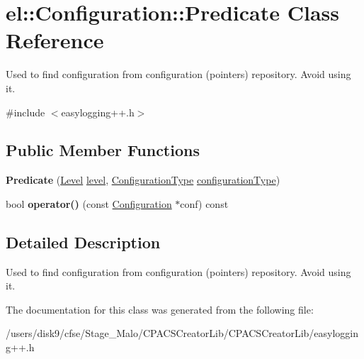 \hypertarget{classel_1_1Configuration_1_1Predicate}{\section{el\-:\-:Configuration\-:\-:Predicate Class Reference}
\label{classel_1_1Configuration_1_1Predicate}
}


Used to find configuration from configuration (pointers) repository. Avoid using it.  




{\ttfamily \#include $<$easylogging++.\-h$>$}

\subsection*{Public Member Functions}
\begin{DoxyCompactItemize}
\item 
\hypertarget{classel_1_1Configuration_1_1Predicate_ab0a4580d6c2d1aaf36a62913fdc38447}{{\bfseries Predicate} (\hyperlink{namespaceel_ab0ac6091262344c52dd2d3ad099e8e36}{Level} \hyperlink{classel_1_1Configuration_a66a96cf46d20204c50718f8a5e3622e2}{level}, \hyperlink{namespaceel_a281f5db6d6163678bc68a8b23b59e124}{Configuration\-Type} \hyperlink{classel_1_1Configuration_aab5091dcca176e309c0a2268ff55db0d}{configuration\-Type})}\label{classel_1_1Configuration_1_1Predicate_ab0a4580d6c2d1aaf36a62913fdc38447}

\item 
\hypertarget{classel_1_1Configuration_1_1Predicate_a985dce44ae06854e789a2ad3be11698f}{bool {\bfseries operator()} (const \hyperlink{classel_1_1Configuration}{Configuration} $\ast$conf) const }\label{classel_1_1Configuration_1_1Predicate_a985dce44ae06854e789a2ad3be11698f}

\end{DoxyCompactItemize}


\subsection{Detailed Description}
Used to find configuration from configuration (pointers) repository. Avoid using it. 

The documentation for this class was generated from the following file\-:\begin{DoxyCompactItemize}
\item 
/users/disk9/cfse/\-Stage\-\_\-\-Malo/\-C\-P\-A\-C\-S\-Creator\-Lib/\-C\-P\-A\-C\-S\-Creator\-Lib/easylogging++.\-h\end{DoxyCompactItemize}
